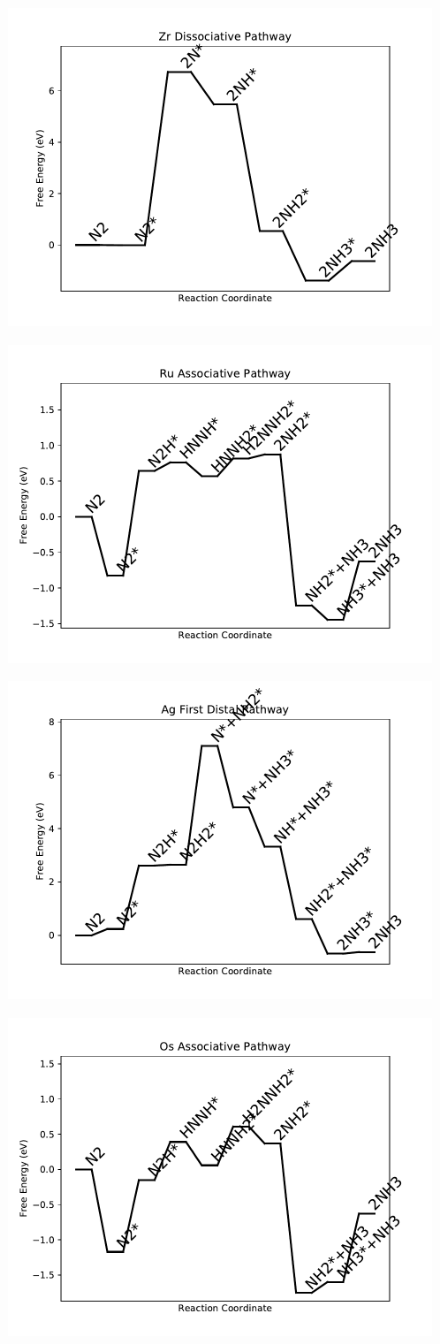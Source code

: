 \documentclass[journal=jacsat,manuscript=article]{achemso}
\begin{document}
\begin{figure}
\includegraphics[width=0.5\linewidth]{data/plots/Zr_dissociative.pdf}
\label{fig:Zr_dissociative}
\end{figure}

\newpage
\begin{figure}
\includegraphics[width=0.5\linewidth]{data/plots/Ru_associative.pdf}
\label{fig:Ru_associative}
\end{figure}

\begin{figure}
\includegraphics[width=0.5\linewidth]{data/plots/Ag_distal_1.pdf}
\label{fig:Ag_distal_1}
\end{figure}

\newpage
\begin{figure}
\includegraphics[width=0.5\linewidth]{data/plots/Os_associative.pdf}
\label{fig:Os_associative}
\end{figure}
\end{document}
